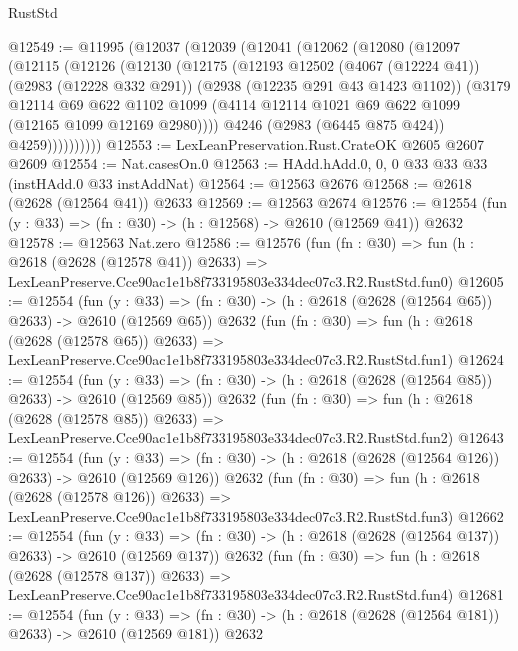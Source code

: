 \begin{lexlean}{RustStd}
\begin{coremodule}
@12549 := @11995
    (@12037
      (@12039
        (@12041
          (@12062
            (@12080
              (@12097
                (@12115
                  (@12126
                    (@12130
                      (@12175
                        (@12193
                          @12502
                          (@4067 (@12224 @41))
                          (@2983 (@12228 @332 @291))
                          (@2938 (@12235 @291 @43 @1423 @1102))
                          (@3179
                            @12114
                            @69
                            @622
                            @1102
                            @1099
                            (@4114 @12114 @1021 @69 @622 @1099 (@12165 @1099 @12169 @2980))))
                        @4246
                        (@2983 (@6445 @875 @424))
                        @4259))))))))))
@12553 := LexLeanPreservation.Rust.CrateOK @2605 @2607 @2609
@12554 := Nat.casesOn.{0}
@12563 := HAdd.hAdd.{0, 0, 0} @33 @33 @33 (instHAdd.{0} @33 instAddNat)
@12564 := @12563 @2676
@12568 := @2618 (@2628 (@12564 @41)) @2633
@12569 := @12563 @2674
@12576 := @12554 (fun (y : @33) => (fn : @30) -> (h : @12568) -> @2610 (@12569 @41)) @2632
@12578 := @12563 Nat.zero
@12586 := @12576
    (fun (fn : @30) =>
    fun (h : @2618 (@2628 (@12578 @41)) @2633) =>
    LexLeanPreserve.Cce90ac1e1b8f733195803e334dec07c3.R2.RustStd.fun0)
@12605 := @12554
    (fun (y : @33) => (fn : @30) -> (h : @2618 (@2628 (@12564 @65)) @2633) -> @2610 (@12569 @65))
    @2632
    (fun (fn : @30) =>
    fun (h : @2618 (@2628 (@12578 @65)) @2633) =>
    LexLeanPreserve.Cce90ac1e1b8f733195803e334dec07c3.R2.RustStd.fun1)
@12624 := @12554
    (fun (y : @33) => (fn : @30) -> (h : @2618 (@2628 (@12564 @85)) @2633) -> @2610 (@12569 @85))
    @2632
    (fun (fn : @30) =>
    fun (h : @2618 (@2628 (@12578 @85)) @2633) =>
    LexLeanPreserve.Cce90ac1e1b8f733195803e334dec07c3.R2.RustStd.fun2)
@12643 := @12554
    (fun (y : @33) => (fn : @30) -> (h : @2618 (@2628 (@12564 @126)) @2633) -> @2610 (@12569 @126))
    @2632
    (fun (fn : @30) =>
    fun (h : @2618 (@2628 (@12578 @126)) @2633) =>
    LexLeanPreserve.Cce90ac1e1b8f733195803e334dec07c3.R2.RustStd.fun3)
@12662 := @12554
    (fun (y : @33) => (fn : @30) -> (h : @2618 (@2628 (@12564 @137)) @2633) -> @2610 (@12569 @137))
    @2632
    (fun (fn : @30) =>
    fun (h : @2618 (@2628 (@12578 @137)) @2633) =>
    LexLeanPreserve.Cce90ac1e1b8f733195803e334dec07c3.R2.RustStd.fun4)
@12681 := @12554
    (fun (y : @33) => (fn : @30) -> (h : @2618 (@2628 (@12564 @181)) @2633) -> @2610 (@12569 @181))
    @2632

\end{coremodule}
\end{lexlean}
